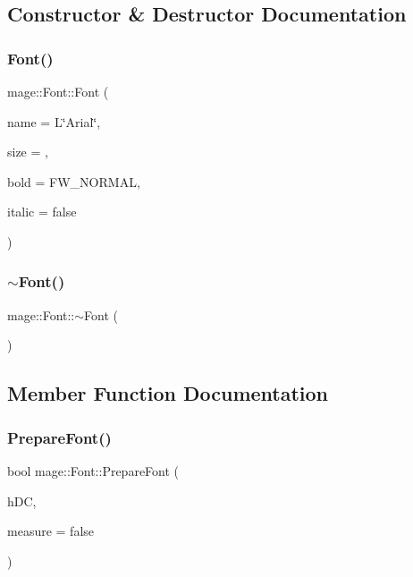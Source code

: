 \subsection{Constructor \& Destructor Documentation}
\hypertarget{classmage_1_1_font_a10cc7123d8afdea0d092467b44dc7b66}{}\label{classmage_1_1_font_a10cc7123d8afdea0d092467b44dc7b66} 
\subsubsection{\texorpdfstring{Font()}{Font()}}
{\footnotesize\ttfamily mage\+::\+Font\+::\+Font (\begin{DoxyParamCaption}\item[{const wstring \&}]{name = {\ttfamily L\char`\"{}Arial\char`\"{}},  }\item[{uint16\+\_\+t}]{size = {},  }\item[{uint32\+\_\+t}]{bold = {\ttfamily FW\+\_\+NORMAL},  }\item[{bool}]{italic = {\ttfamily false} }\end{DoxyParamCaption})}

\hypertarget{classmage_1_1_font_a4aca7ada98c96fd3de2ecd98c82ae6a8}{}\label{classmage_1_1_font_a4aca7ada98c96fd3de2ecd98c82ae6a8} 
\subsubsection{\texorpdfstring{$\sim$\+Font()}{~Font()}}
{\footnotesize\ttfamily mage\+::\+Font\+::$\sim$\+Font (\begin{DoxyParamCaption}{ }\end{DoxyParamCaption})\hspace{0.3cm}{\ttfamily [virtual]}}



\subsection{Member Function Documentation}
\hypertarget{classmage_1_1_font_a4cbf910a292f2957b43fd4060db6aba4}{}\label{classmage_1_1_font_a4cbf910a292f2957b43fd4060db6aba4} 
\subsubsection{\texorpdfstring{Prepare\+Font()}{PrepareFont()}}
{\footnotesize\ttfamily bool mage\+::\+Font\+::\+Prepare\+Font (\begin{DoxyParamCaption}\item[{H\+DC}]{h\+DC,  }\item[{bool}]{measure = {\ttfamily false} }\end{DoxyParamCaption})\hspace{0.3cm}{\ttfamily [protected]}}

